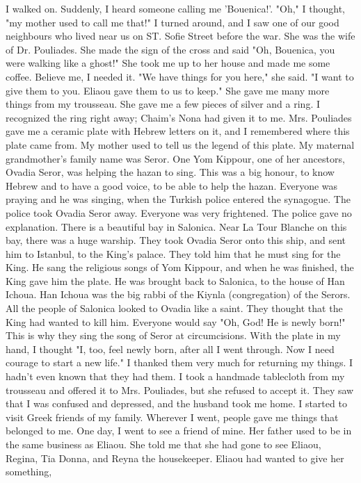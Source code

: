 I walked on. Suddenly, I heard someone calling me 'Bouenica!’. 
"Oh," I thought, "my mother used to call me that!" I turned around, 
and I saw one of our good neighbours who lived near us on ST. Sofie 
Street before the war. She was the wife of Dr. Pouliades. She made the 
sign of the cross and said "Oh, Bouenica, you were walking like a 
ghost!" She took me up to her house and made me some coffee. Believe 
me, I needed it. 
"We have things for you here," she said. "I want to give them to
you. Eliaou gave them to us to keep." She gave me many more things 
from my trousseau. She gave me a few pieces of silver and a ring. I 
recognized the ring right away; Chaim's Nona had given it to me. Mrs.
Pouliades gave me a ceramic plate with Hebrew letters on it, and I remembered where this plate came from. 
My mother used to tell us the legend of this plate. My maternal 
grandmother's family name was Seror. One Yom Kippour, one of her 
ancestors, Ovadia Seror, was helping the hazan to sing. This was a big 
honour, to know Hebrew and to have a good voice, to be able to help the 
hazan. Everyone was praying and he was singing, when the Turkish police entered the synagogue. The police took Ovadia Seror away. Everyone was very frightened. The police gave no explanation. There is a 
beautiful bay in Salonica. Near La Tour Blanche on this bay, there 
was a huge warship. They took Ovadia Seror onto this ship, and sent 
him to Istanbul, to the King’s palace. They told him that he must sing 
for the King. He sang the religious songs of Yom Kippour, and when he 
was finished, the King gave him the plate. He was brought back to Salonica, to the house of Han Ichoua. Han Ichoua was the big rabbi of 
the Kiynla (congregation) of the Serors. All the people of Salonica 
looked to Ovadia like a saint. They thought that the King had wanted 
to kill him. Everyone would say "Oh, God! He is newly born!" This 
is why they sing the song of Seror at circumcisions. 
With the plate in my hand, I thought "I, too, feel newly born, after all I went through. Now I need courage to start a new life." I 
thanked them very much for returning my things. I hadn't even known 
that they had them. I took a handmade tablecloth from my trousseau and 
offered it to Mrs. Pouliades, but she refused to accept it. They saw 
that I was confused and depressed, and the husband took me home. 
I started to visit Greek friends of my family. Wherever I went, people gave me 
things that belonged to me. One day, I went to see a friend of mine. Her father used 
to be in the same business as Eliaou. She told me that she had gone to see Eliaou, Regina, Tia Donna, and Reyna the housekeeper. Eliaou had wanted to give her something,
